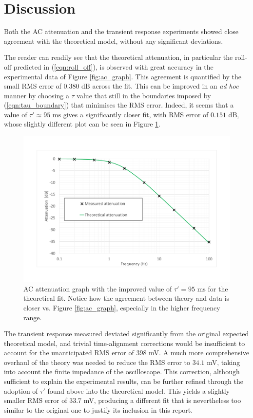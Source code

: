\documentclass{article}
\begin{document}
\section{Discussion}
Both the AC attenuation and the transient response experiments showed close agreement with the theoretical model, without any significant deviations. 
\par The reader can readily see that the theoretical attenuation, in particular the roll-off predicted in (\ref{eqn:roll_off}), is observed with great accuracy in the experimental data of Figure \ref{fig:ac_graph}. This agreement is quantified by the small RMS error of $0.380 \text{ dB}$ across the fit. This can be improved in an \textit{ad hoc} manner by choosing a $\tau$ value that still in the boundaries imposed by (\ref{eqn:tau_boundary}) that minimises the RMS error. Indeed, it seems that a value of $\tau ' \approx 95\text{ ms}$ gives a significantly closer fit, with RMS error of  $0.151 \text{ dB}$, whose slightly different plot can be seen in Figure \ref{fig:ac_graph_corrected}.
\begin{figure}[!htb]
    \centering
    \includegraphics[width=\linewidth]{ac_graph_corrected.pdf}
    \caption{AC attenuation graph with the improved value of $\tau' = 95\text{ ms}$ for the theoretical fit. Notice how the agreement between theory and data is closer vs. Figure \ref{fig:ac_graph}, especially in the higher frequency range.}
    \label{fig:ac_graph_corrected}
\end{figure}
\par The transient response measured deviated significantly from the original expected theoretical model, and trivial time-alignment corrections would be insufficient to account for the unanticipated RMS error of $398$ mV. A much more comprehensive overhaul of the theory was needed to reduce the RMS error to $34.1$ mV, taking into account the finite impedance of the oscilloscope. This correction, although sufficient to explain the experimental results, can be further refined through the adoption of $\tau'$ found above into the theoretical model. This yields a slightly smaller RMS error of $33.7$ mV, producing a different fit that is nevertheless too similar to the original one to justify its inclusion in this report.  
\end{document}
